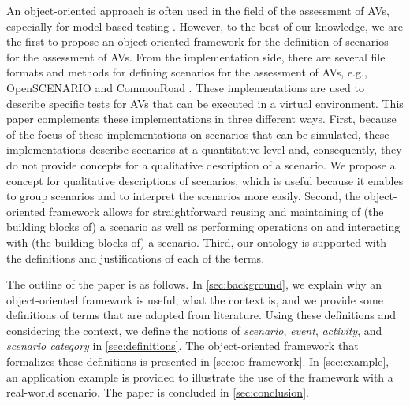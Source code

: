 \cstartb An object-oriented approach is often used in the field of the assessment of AVs, especially for model-based testing \autocite{tsai2003scenario, utting2012taxonomy, zofka2016testing, wittmann2017method}. \cendb
However, to the best of our knowledge, we are the first to propose an \cstartb object-oriented framework for the definition of \cendb scenarios for the assessment of AVs. 
From the implementation side, there are several file formats and methods for \cstartb defining scenarios for the assessment of AVs\cendb, e.g., OpenSCENARIO \autocite{openscenario} and CommonRoad \autocite{althoff2017CommonRoad}. 
\cstart These implementations are used to describe specific tests for AVs that can be executed in a virtual environment.
\cstartb This paper complements these implementations in three different ways. 
First, because of the focus of these implementations on scenarios that can be simulated, these implementations describe scenarios at a quantitative level and, consequently, they do not provide concepts for a qualitative description of a scenario. 
We propose a concept for qualitative descriptions of scenarios, which is useful because it enables to group scenarios and to interpret the scenarios more easily.
Second, the object-oriented framework allows for straightforward reusing and maintaining of (the building blocks of) a scenario as well as performing operations on and interacting with (the building blocks of) a scenario.
Third, our ontology is supported with the definitions and justifications of each of the terms. \cendb

The outline of the paper is as follows. In \cref{sec:background}, we explain why an \cstartb object-oriented framework \cendb is useful, what the context is, and we provide some definitions of terms that are adopted from literature. 
Using these definitions and considering the context, we define the notions of \emph{scenario}, \emph{event}, \emph{activity}, and \emph{scenario category}  in \cref{sec:definitions}. 
The \cstartb object-oriented framework \cendb that formalizes these definitions is presented in \cref{sec:oo framework}. 
In \cref{sec:example}, an application example is provided to illustrate the use of the \cstartb framework \cendb with a real-world scenario. 
The paper is concluded in \cref{sec:conclusion}.
